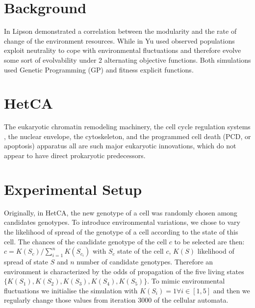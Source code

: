 \documentclass{sig-alternate-05-2015}
\begin{document}
\section{Background}
In \cite{lipson2002origin} Lipson demonstrated a correlation between the modularity and the rate of change of the environment resources. While in \cite{yu2007program} Yu used  observed populations exploit neutrality to cope with environmental fluctuations and therefore evolve some sort of evolvability under 2 alternating objective functions. Both simulations used Genetic Programming (GP) and fitness explicit functions.

\section{HetCA}


The eukaryotic chromatin remodeling machinery, the cell cycle regulation
systems \cite{koonin2002origin}, the nuclear envelope, the cytoskeleton, and the
programmed cell death (PCD, or apoptosis) apparatus all are
such major eukaryotic innovations, which do not appear to
have direct prokaryotic predecessors. 

\section{Experimental Setup}
Originally, in HetCA, the new genotype of a cell was randomly chosen among candidates genotypes. To introduce environmental variations, we chose to vary the likelihood of spread of the genotype of a cell according to the state of this cell. The chances of the candidate genotype of the cell $c$ to be selected are then: $c=K(S_c)/\sum_{i=1}^{n} K(S_{c_i})$ with $S_c$ state of the cell $c$, $K(S)$ likelihood of spread of state $S$ and $n$ number of candidate genotypes. Therefore an environment is characterized by the odds of propagation of the five living states $\{K(S_1),K(S_2),K(S_3),K(S_4),K(S_5)\}$.   
To mimic environmental fluctuations we initialise the simulation with $K(S_i)=1  \forall i \in [1,5]$ and then we regularly change those values from iteration 3000 of the cellular automata. 
\end{document}

